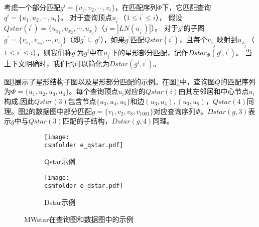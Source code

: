 \begin{definition}[星形部分匹配]\label{def:star-submatch}
    考虑一个部分匹配$g^i=\{v_1, v_2, \cdots, v_i\}$，在匹配序列$\Phi$下，它匹配查询$q^i=\{u_1, u_2, \cdots, u_{i}\}$。
对于查询顶点$u_{i^\prime}$（$1 \leq i^\prime \leq i$），
假设$Qstar(i^\prime) = \{u_{x_1}, u_{x_2}, \cdots, u_{x_j}\}$（$j = |LN(u_{i^\prime})|$）。
对于$g^i$的子图$g^\prime = \{v_{x_1}, v_{x_2}, \cdots, v_{x_j}\}$（即$g^\prime \subseteq g^i$），如果$g^\prime$匹配$Qstar(i^\prime)$，且每个$v_{x_{j^\prime}}$映射到$u_{x_{j^\prime}}$（$1 \leq i^\prime \leq i$），则我们称$g^\prime$为$g^i$中在$u_{i^\prime}$下的星形部分匹配，记作$Dstar_{\Phi}(g^i, i^\prime)$。
当上下文明确时，我们也可以简化为$Dstar(g^i, i^\prime)$。
\end{definition}
图\ref{fig:exp:mwstar}展示了星形结构子图以及星形部分匹配的示例。在图\ref{fig:qstar}中，查询图$Q$的匹配序列为$\Phi=\{u_1,u_2,u_3,u_4\}$。每个查询顶点$u_i$对应的$Qstar(i)$由其左邻居和中心节点$u_i$构成,因此$Qstar(3)$包含节点$\{u_3,u_4,u_5\}$和边$(u_3,u_4),(u_3,u_5)$，$Qstar(4)$同理。图\ref{fig:dstar}的数据图中部分匹配$g=\{v_1,v_2,v_8,v_{1001}\}$对应查询序列$\Phi$。$Dstar(g,3)$表示$g$中与$Qstar(3)$匹配的子结构，$Dstar(g,4)$同理。
\begin{figure}[h!]
    \def\wscorevone{0.45}
    \centering
    \begin{subfigure}[t]{0.465\linewidth}
    \centering
    \resizebox{\linewidth}{!}
    {
    \texttt{[image: \\csmfolder e\_qstar.pdf]}
    }
    \caption{Qstar示例}
    \label{fig:qstar}
    \end{subfigure}
    \hspace{-1cm}
    \begin{subfigure}[t]{0.515\linewidth}
    \centering
    \resizebox{\linewidth}{!}
    {
    \texttt{[image: \\csmfolder e\_dstar.pdf]}
    }
    \caption{Dstar示例}
    \label{fig:dstar}
    \end{subfigure}
    \caption{MWstar在查询图和数据图中的示例}
    \label{fig:exp:mwstar}
    \end{figure}
